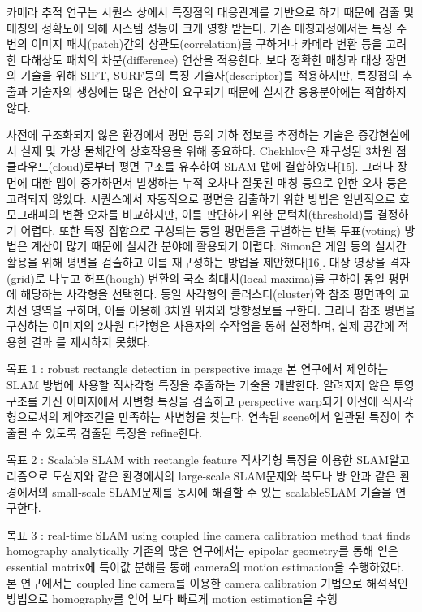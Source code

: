 \documentclass[master,korean,final]{cbnu-ecs}
\begin{document}
카메라 추적 연구는 시퀀스 상에서 특징점의 대응관계를 기반으로 하기 때문에 검출 및 매칭의 정확도에 의해 시스템 성능이 크게 영향 받는다. 기존 매칭과정에서는 특징 주변의 이미지 패치(patch)간의 상관도(correlation)를 구하거나 카메라 변환 등을 고려한 다해상도 패치의 차분(difference) 연산을 적용한다. 보다 정확한 매칭과 대상 장면의 기술을 위해 SIFT, SURF등의 특징 기술자(descriptor)를 적용하지만, 특징점의 추출과 기술자의 생성에는 많은 연산이 요구되기 때문에 실시간 응용분야에는 적합하지 않다.

사전에 구조화되지 않은 환경에서 평면 등의 기하 정보를 추정하는 기술은 증강현실에서 실제 및 가상 물체간의 상호작용을 위해 중요하다. Chekhlov은 재구성된 3차원 점 클라우드(cloud)로부터 평면 구조를 유추하여 SLAM 맵에 결합하였다[15].
그러나 장면에 대한 맵이 증가하면서 발생하는 누적 오차나 잘못된 매칭 등으로 인한 오차 등은 고려되지 않았다. 시퀀스에서 자동적으로 평면을 검출하기 위한 방법은 일반적으로 호모그래피의 변환 오차를 비교하지만, 이를 판단하기 위한 문턱치(threshold)를 결정하기 어렵다. 또한 특징 집합으로 구성되는 동일 평면들을 구별하는 반복 투표(voting) 방법은 계산이 많기 때문에 실시간 분야에 활용되기 어렵다.
Simon은 게임 등의 실시간 활용을 위해 평면을 검출하고 이를 재구성하는 방법을 제안했다[16].
대상 영상을 격자(grid)로 나누고 허프(hough) 변환의 국소 최대치(local maxima)를 구하여 동일 평면에 해당하는 사각형을 선택한다. 동일 사각형의 클러스터(cluster)와 참조 평면과의 교차선 영역을 구하며, 이를 이용해 3차원 위치와 방향정보를 구한다. 그러나 참조 평면을 구성하는 이미지의 2차원 다각형은 사용자의 수작업을 통해 설정하며, 실제 공간에 적용한 결과
를 제시하지 못했다. 


목표 1 : robust rectangle detection in perspective image
본 연구에서 제안하는 SLAM 방법에 사용할 직사각형 특징을 추출하는 기술을 개발한다. 알려지지 않은 투영구조를 가진 이미지에서 사변형 특징을 검출하고 perspective warp되기 이전에 직사각형으로서의 제약조건을 만족하는 사변형을 찾는다. 연속된 scene에서 일관된 특징이 추출될 수 있도록 검출된 특징을 refine한다. 

목표 2 : Scalable SLAM with rectangle feature
직사각형 특징을 이용한 SLAM알고리즘으로 도심지와 같은 환경에서의 large-scale SLAM문제와 복도나 방 안과 같은 환경에서의 small-scale SLAM문제를 동시에 해결할 수 있는 scalableSLAM 기술을 연구한다. 

목표 3 : real-time SLAM using coupled line camera calibration method that finds homography analytically 
기존의 많은 연구에서는 epipolar geometry를 통해 얻은 essential matrix에 특이값 분해를 통해 camera의 motion estimation을 수행하였다. 본 연구에서는 coupled line camera를 이용한 camera calibration 기법으로 해석적인 방법으로 homography를 얻어 보다 빠르게 motion estimation을 수행
\end{document}
